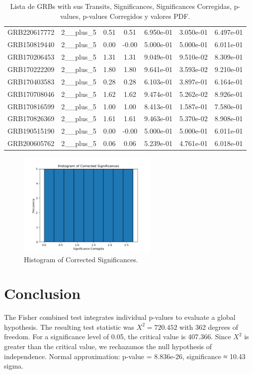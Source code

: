 \documentclass[12pt]{article}
\begin{document}
\begin{table}[h!]
{\begin{tabular}{l c c c c c c}
GRB220617772 & 2__plus_5 & 0.51 & 0.51 & 6.950e-01 & 3.050e-01 & 6.497e-01 \\
GRB150819440 & 2__plus_5 & 0.00 & -0.00 & 5.000e-01 & 5.000e-01 & 6.011e-01 \\
GRB170206453 & 2__plus_5 & 1.31 & 1.31 & 9.049e-01 & 9.510e-02 & 8.309e-01 \\
GRB170222209 & 2__plus_5 & 1.80 & 1.80 & 9.641e-01 & 3.593e-02 & 9.210e-01 \\
GRB170403583 & 2__plus_5 & 0.28 & 0.28 & 6.103e-01 & 3.897e-01 & 6.164e-01 \\
GRB170708046 & 2__plus_5 & 1.62 & 1.62 & 9.474e-01 & 5.262e-02 & 8.926e-01 \\
GRB170816599 & 2__plus_5 & 1.00 & 1.00 & 8.413e-01 & 1.587e-01 & 7.580e-01 \\
GRB170826369 & 2__plus_5 & 1.61 & 1.61 & 9.463e-01 & 5.370e-02 & 8.908e-01 \\
GRB190515190 & 2__plus_5 & 0.00 & -0.00 & 5.000e-01 & 5.000e-01 & 6.011e-01 \\
GRB200605762 & 2__plus_5 & 0.06 & 0.06 & 5.239e-01 & 4.761e-01 & 6.018e-01 \\
\bottomrule
\end{tabular}%
}
\caption{Lista de GRBs with sus Transits, Significances, Significances Corregidas, p-values, p-values Corregidos y valores PDF.}
\end{table}

\begin{figure}[h!]
\centering
\includegraphics[width=0.6\textwidth]{corrected_significance_hist.png}
\caption{Histogram of Corrected Significances.}
\end{figure}

\section*{Conclusion}
The Fisher combined test integrates individual p-values to evaluate a global hypothesis.
The resulting test statistic was $X^2 = 720.452$ with 362 degrees of freedom.
For a significance level of 0.05, the critical value is 407.366.
Since $X^2$ is greater than the critical value, we rechazamos the null hypothesis of independence.
Normal approximation: p-value = 8.836e-26, significance ≈ 10.43 sigma.
\end{document}
